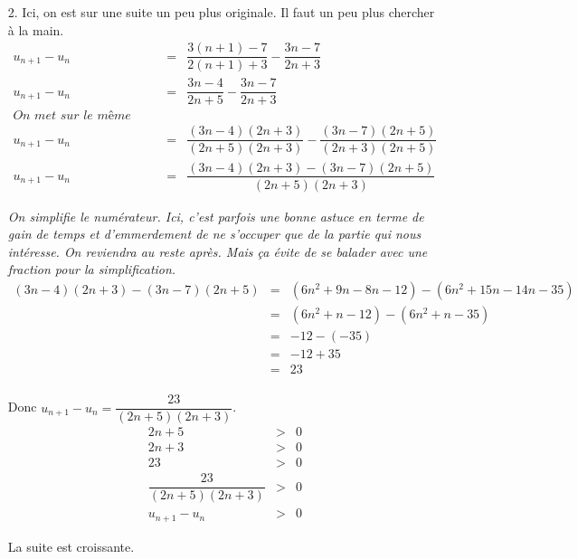 \documentclass[11pt]{article}
\begin{document}
\begin{enumerate}
\item[2.] Ici, on est sur une suite un peu plus originale. Il faut un peu plus chercher à la main.
  \begin{eqnarray*}
    u_{n+1} - u_n &=& \dfrac{3(n+1) - 7}{2(n+1) + 3} - \dfrac{3n - 7}{2n + 3}\\
    u_{n+1} - u_n &=& \dfrac{3n - 4}{2n + 5} - \dfrac{3n - 7}{2n + 3}\\
    \textit{On met sur le même dénominateur.} \\
    u_{n+1} - u_n &=& \dfrac{(3n - 4)(2n + 3)}{(2n + 5)(2n + 3)} - \dfrac{(3n - 7)(2n + 5)}{(2n + 3)(2n + 5)}\\
    u_{n+1} - u_n &=& \dfrac{(3n - 4)(2n + 3) - (3n - 7)(2n + 5)}{(2n + 5)(2n + 3)}
  \end{eqnarray*}
  
  \textit{On simplifie le numérateur. Ici, c'est parfois une bonne astuce en terme de gain de temps et d'emmerdement de ne s'occuper que de la partie qui nous intéresse. On reviendra au reste après. Mais ça évite de se balader avec une fraction pour la simplification.}
  \begin{eqnarray*}
    (3n - 4)(2n + 3) - (3n - 7)(2n + 5) &=& (6n^2 + 9n - 8n - 12) - (6n^2 + 15n - 14n - 35) \\
    &=& (6n^2 + n - 12) - (6n^2 + n - 35) \\
    &=& -12 - (-35) \\
    &=& -12 + 35 \\
    &=& 23 \\ 
  \end{eqnarray*}
  
  Donc $u_{n+1} - u_n = \dfrac{23}{(2n + 5)(2n + 3)}$.
  \begin{eqnarray*}
    2n + 5 &>& 0 \\
    2n + 3 &>& 0 \\
    23 &>& 0 \\
    \dfrac{23}{(2n + 5)(2n + 3)} &>& 0 \\
    u_{n+1} - u_n &>& 0 
  \end{eqnarray*}
  
  La suite est croissante.
  
\end{enumerate}

\newpage
\end{document}
